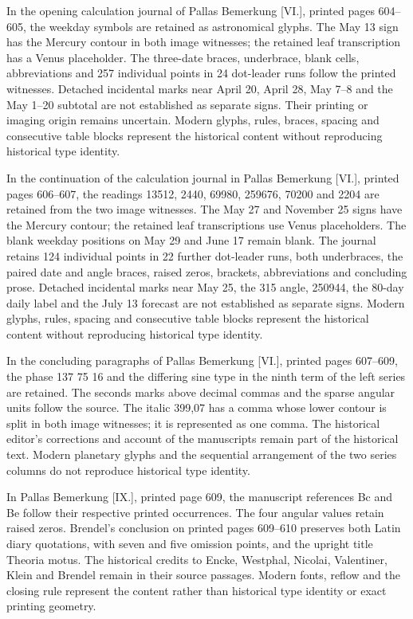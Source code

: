 In the opening calculation journal of Pallas Bemerkung [VI.], printed pages 604--605, the weekday symbols are retained as astronomical glyphs. The May 13 sign has the Mercury contour in both image witnesses; the retained leaf transcription has a Venus placeholder. The three-date braces, underbrace, blank cells, abbreviations and 257 individual points in 24 dot-leader runs follow the printed witnesses. Detached incidental marks near April 20, April 28, May 7--8 and the May 1--20 subtotal are not established as separate signs. Their printing or imaging origin remains uncertain. Modern glyphs, rules, braces, spacing and consecutive table blocks represent the historical content without reproducing historical type identity.

In the continuation of the calculation journal in Pallas Bemerkung [VI.], printed pages 606--607, the readings 13512, 2440, 69980, 259676, 70200 and 2204 are retained from the two image witnesses. The May 27 and November 25 signs have the Mercury contour; the retained leaf transcriptions use Venus placeholders. The blank weekday positions on May 29 and June 17 remain blank. The journal retains 124 individual points in 22 further dot-leader runs, both underbraces, the paired date and angle braces, raised zeros, brackets, abbreviations and concluding prose. Detached incidental marks near May 25, the 315 angle, 250944, the 80-day daily label and the July 13 forecast are not established as separate signs. Modern glyphs, rules, spacing and consecutive table blocks represent the historical content without reproducing historical type identity.

In the concluding paragraphs of Pallas Bemerkung [VI.], printed pages 607--609, the phase 137 75 16 and the differing sine type in the ninth term of the left series are retained. The seconds marks above decimal commas and the sparse angular units follow the source. The italic 399,07 has a comma whose lower contour is split in both image witnesses; it is represented as one comma. The historical editor's corrections and account of the manuscripts remain part of the historical text. Modern planetary glyphs and the sequential arrangement of the two series columns do not reproduce historical type identity.

In Pallas Bemerkung [IX.], printed page 609, the manuscript references Bc and Be follow their respective printed occurrences. The four angular values retain raised zeros. Brendel’s conclusion on printed pages 609--610 preserves both Latin diary quotations, with seven and five omission points, and the upright title Theoria motus. The historical credits to Encke, Westphal, Nicolai, Valentiner, Klein and Brendel remain in their source passages. Modern fonts, reflow and the closing rule represent the content rather than historical type identity or exact printing geometry.

